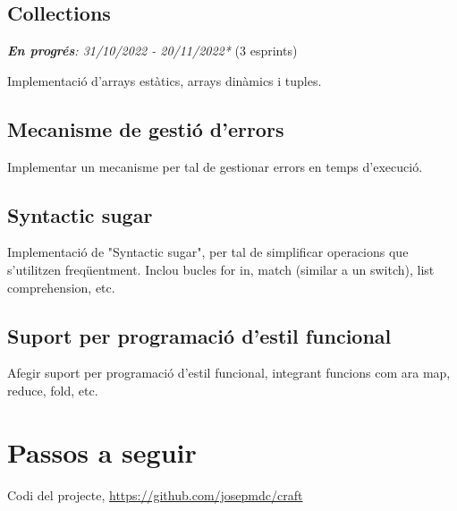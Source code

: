 ﻿\documentclass{article}
\begin{document}
\subsection{Collections}
\textit{\textbf{En progrés}: 31/10/2022 - 20/11/2022*} (3 esprints)

Implementació d'arrays estàtics, arrays dinàmics i tuples.

\subsection{Mecanisme de gestió d'errors}
Implementar un mecanisme per tal de gestionar errors en temps d'execució.

\subsection{Syntactic sugar}
Implementació de "Syntactic sugar", per tal de simplificar operacions que
s'utilitzen freqüentment. Inclou bucles for in, match (similar a un switch),
list comprehension, etc.

\subsection{Suport per programació d'estil funcional}
Afegir suport per programació d'estil funcional, integrant funcions com ara map,
reduce, fold, etc.

\section{Passos a seguir}

\begin{thebibliography}{9}

 Codi del projecte, \url{https://github.com/josepmdc/craft}

\end{thebibliography}
\end{document}
